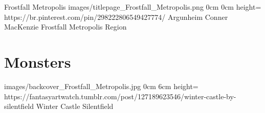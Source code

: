 \documentclass[letterpaper,openany,twoside,twocolumn]{book}
\begin{document}
	\regionTitlePage
		{Frostfall Metropolis}
		{images/titlepage_Frostfall_Metropolis.png}
		{0cm}
		{0cm}
		{height=\paperheight}
		{https://br.pinterest.com/pin/298222806549427774/}
		{Argunheim}
		{Conner MacKenzie}
		{Frostfall Metropolis Region}
	
	\tableofcontents
	
	\mainmatter
	
	\MonsterSheetGeometry
	\part{Monsters}
	
	
	\regionLastPage
		{images/backcover_Frostfall_Metropolis.jpg}
		{0cm}
		{6cm}
		{height=\paperheight}
		{https://fantasyartwatch.tumblr.com/post/127189623546/winter-castle-by-silentfield}
		{Winter Castle}
		{Silentfield}
		{}
\end{document}
